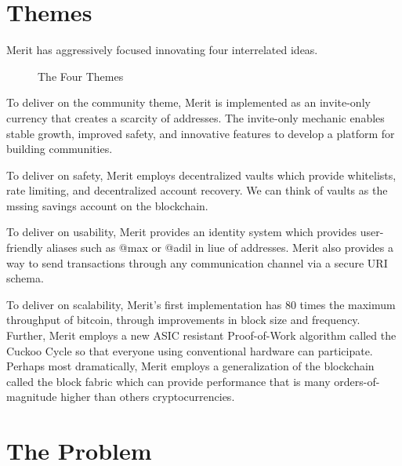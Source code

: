 \documentclass{article}
\begin{document}
\newpage
\section{Themes}
Merit has aggressively focused innovating four interrelated ideas. 

\begin{figure}[H]
    \begin{center}
    \end{center}
    \caption{The Four Themes}

\end{figure}

To deliver on the community theme, Merit is implemented as an invite-only currency that creates a scarcity
of addresses.  The invite-only mechanic enables stable growth, improved safety,
and innovative features to develop a platform for building communities.

To deliver on safety, Merit employs decentralized \glspl{vault} which provide whitelists,
rate limiting, and decentralized account recovery.  We can think of vaults as the mssing savings 
account on the blockchain.

To deliver on usability, Merit provides an identity system which provides user-friendly
aliases such as @max or @adil in liue of addresses.  Merit also provides a way to send \glspl{transaction} through any
communication channel via a secure URI schema.

To deliver on scalability, Merit's first implementation has 80 times the maximum throughput of bitcoin, through improvements in block size and frequency.  
Further, Merit employs a new ASIC resistant Proof-of-Work algorithm called
the Cuckoo Cycle so that everyone using conventional hardware can participate.
Perhaps most dramatically,
Merit employs a generalization of the blockchain called the \gls{block fabric} 
which can provide performance that is many orders-of-magnitude higher than others cryptocurrencies.

\section{The Problem}
\end{document}
